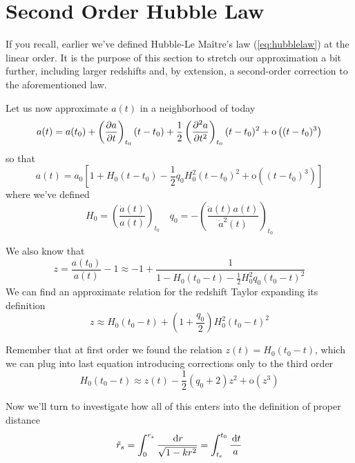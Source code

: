\section{Second Order Hubble Law}

If you recall, earlier we've defined Hubble-Le Maître's law (\ref{eq:hubblelaw}) at the linear order. It is the purpose of this section to stretch our approximation a bit further, including larger redshifts and, by extension, a second-order correction to the aforementioned law.
\par Let us now approximate $a(t)$ in a neighborhood of today
\begin{equation*}
    a(t) = a(t_{0}) + \left(\frac{\partial a}{\partial t}\right)_{t_{0}}(t-t_{0}) + \frac{1}{2}\left(\frac{\partial^{2} a}{\partial t^{2}}\right)_{t_{0}}(t-t_{0})^{2} + \text{o}\left((t-t_{0})^{3}\right)
\end{equation*}
so that
\begin{equation}
    a(t) = a_{0}\left[1 + H_{0}(t-t_{0})-\frac{1}{2}q_{0}H_{0}^{2}(t-t_{0})^{2} + \text{o}\left((t-t_{0})^{3}\right)\right]
    \label{eq:a_expansion-second}
\end{equation}
where we've defined 
\begin{equation}
    H_{0} = \left(\frac{\dot{a}(t)}{a(t)}\right)_{t_{0}} \quad q_{0} = -\left(\frac{\ddot{a}(t)a(t)}{\dot{a}^{2}(t)}\right)_{t_{0}}
\end{equation}
\par We also know that
\begin{equation*}
    z = \frac{a(t_{0})}{a(t)}-1 \approx -1 + \frac{1}{1-H_{0}(t_{0}-t)-\frac{1}{2}H_{0}^{2}q_{0}(t_{0}-t)^{2}}
\end{equation*}
We can find an approximate relation for the redshift Taylor expanding its definition
\begin{equation*}
    z \approx H_{0}(t_{0}-t)+\left(1+\frac{q_{0}}{2}\right)H_{0}^{2}(t_{0}-t)^{2}
\end{equation*}
\par Remember that at first order we found the relation $z(t) = H_{0}(t_{0}-t)$, which we can plug into last equation introducing corrections only to the third order
\begin{equation}
    H_{0}(t_{0}-t) \approx z(t) -\frac{1}{2}(q_{0}+2)z^{2} +\text{o}(z^{3})
\end{equation}
\par Now we'll turn to investigate how all of this enters into the definition of proper distance
\begin{equation}
    \tilde{r}_{s} =  \int_{0}^{r_{s}}\frac{\,\text{d}r}{\sqrt{1-kr^{2}}} = \int_{t_{e}}^{t_{0}}\frac{\,\text{d}t}{a}
\end{equation}
